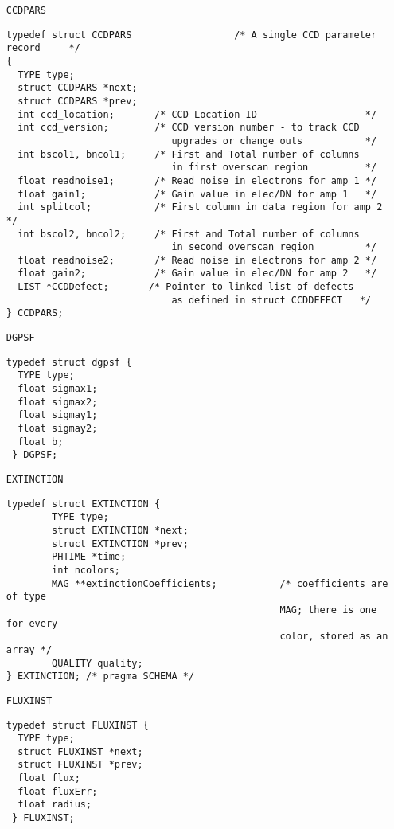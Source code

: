 {\begin{itemize}
\item[{\tt CCDPARS}]

\begin{verbatim}
typedef struct CCDPARS                  /* A single CCD parameter record     */
{
  TYPE type;
  struct CCDPARS *next;
  struct CCDPARS *prev;
  int ccd_location;       /* CCD Location ID                   */
  int ccd_version;        /* CCD version number - to track CCD
                             upgrades or change outs           */
  int bscol1, bncol1;     /* First and Total number of columns
                             in first overscan region          */
  float readnoise1;       /* Read noise in electrons for amp 1 */
  float gain1;            /* Gain value in elec/DN for amp 1   */
  int splitcol;           /* First column in data region for amp 2 */
  int bscol2, bncol2;     /* First and Total number of columns
                             in second overscan region         */
  float readnoise2;       /* Read noise in electrons for amp 2 */
  float gain2;            /* Gain value in elec/DN for amp 2   */
  LIST *CCDDefect;       /* Pointer to linked list of defects
                             as defined in struct CCDDEFECT   */
} CCDPARS;
\end{verbatim}

\item[{\tt DGPSF}]

\begin{verbatim}
typedef struct dgpsf {
  TYPE type;
  float sigmax1;
  float sigmax2;
  float sigmay1;
  float sigmay2;
  float b;
 } DGPSF;
\end{verbatim}

\item[{\tt EXTINCTION}]

\begin{verbatim}
typedef struct EXTINCTION {
        TYPE type;
        struct EXTINCTION *next;
        struct EXTINCTION *prev;
        PHTIME *time;
        int ncolors;
        MAG **extinctionCoefficients;           /* coefficients are of type
                                                MAG; there is one for every
                                                color, stored as an array */
        QUALITY quality;
} EXTINCTION; /* pragma SCHEMA */
\end{verbatim}

\item[{\tt FLUXINST}]

\begin{verbatim}
typedef struct FLUXINST {
  TYPE type;
  struct FLUXINST *next;
  struct FLUXINST *prev;
  float flux;
  float fluxErr;
  float radius;
 } FLUXINST;
\end{verbatim}


\end{itemize}}
